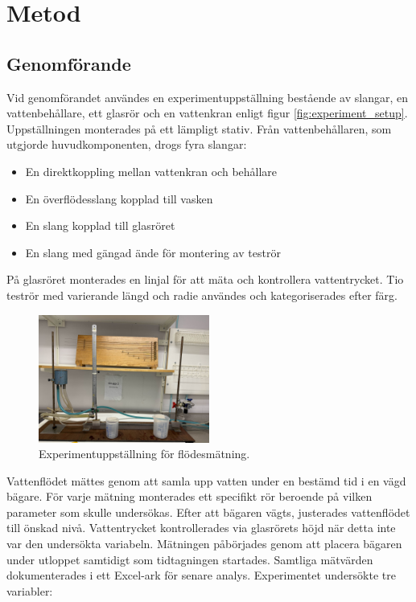 \documentclass[a4paper,12pt]{article}
\begin{document}
\section{Metod}
\subsection{Genomförande}
\noindent
Vid genomförandet användes en experimentuppställning bestående av slangar, 
en vattenbehållare, ett glasrör och en vattenkran enligt figur \ref{fig:experiment_setup}. 
Uppställningen monterades på ett lämpligt stativ. Från vattenbehållaren, som utgjorde 
huvudkomponenten, drogs fyra slangar:
%
\begin{itemize}
    \item En direktkoppling mellan vattenkran och behållare
    \item En överflödesslang kopplad till vasken
    \item En slang kopplad till glasröret
    \item En slang med gängad ände för montering av teströr
\end{itemize}
%
På glasröret monterades en linjal för att mäta och kontrollera vattentrycket. 
Tio teströr med varierande längd och radie användes och kategoriserades efter färg.
%
\begin{figure}[ht]
    \centering
    \includegraphics[width=0.5\textwidth]{Labb-yta.jpg}
    \caption{Experimentuppställning för flödesmätning.}
\end{figure}
%
\noindent
Vattenflödet mättes genom att samla upp vatten under en bestämd tid i en vägd bägare. 
För varje mätning monterades ett specifikt rör beroende på vilken parameter som skulle 
undersökas. Efter att bägaren vägts, justerades vattenflödet till önskad nivå. 
Vattentrycket kontrollerades via glasrörets höjd när detta inte var den undersökta 
variabeln.
%
Mätningen påbörjades genom att placera bägaren under utloppet samtidigt som 
tidtagningen startades. Samtliga mätvärden dokumenterades i ett Excel-ark för 
senare analys. Experimentet undersökte tre variabler:
\end{document}
